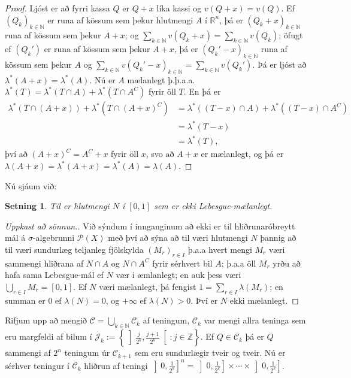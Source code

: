 \documentclass[a4paper,icelandic,11pt]{book}
\theoremstyle{plain}      \newtheorem{setn}{Setning}[chapter]
\theoremstyle{definition} \newtheorem{skilgr}[setn]{Skilgreining}
\theoremstyle{remark}     \newtheorem*{ath}{Athugasemd}
\newcommand{\R}{\mathbb R}
\newcommand{\N}{\mathbb N}
\newcommand{\Z}{\mathbb Z}
\begin{document}
\begin{proof}
  Ljóst er að fyrri kassa $Q$ er $Q+x$ líka kassi og $v(Q+x)=v(Q)$. Ef
  $(Q_{k})_{k\in\N}$ er runa af kössum sem þekur hlutmengi $A$ í
  $\R^{n}$, þá er $(Q_{k}+x)_{k\in\N}$ runa af kössum sem þekur $A+x$;
  og $\sum_{k\in\N}v(Q_{k}+x)=\sum_{k\in\N}v(Q_{k})$; öfugt ef
  $(Q_{k}')$ er runa af kössum sem þekur $A+x$, þá er
  $(Q_{k}'-x)_{k\in\N}$ runa af kössum sem þekur $A$ og
  $\sum_{k\in\N}v(Q_{k}'-x)_{k\in\N}=\sum_{k\in\N}v(Q_{k}')$. Þá er
  ljóst að $\lambda^{*}(A+x)=\lambda^{*}(A)$. Nú er $A$ mælanlegt
  þ.þ.a.a. $\lambda^{*}(T)=\lambda^{*}(T\cap{A})+\lambda^{*}(T\cap{A}^{C})$
  fyrir öll $T$. En þá er
  \begin{align*}
    \lambda^{*}(T\cap(A+x)) + \lambda^{*}(T\cap(A+x)^{C})
    &= \lambda^{*}((T-x)\cap A) + \lambda^{*}((T-x)\cap A^{C})
    \\
    &= \lambda^{*}(T-x)
    \\
    &= \lambda^{*}(T),
  \end{align*}
  því að $(A+x)^{C}=A^{C}+x$ fyrir öll $x$, svo að $A+x$ er mælanlegt,
  og þá er $\lambda(A+x)=\lambda^{*}(A+x)=\lambda^{*}(A)=\lambda(A)$.
\end{proof}
Nú sjáum við:
\begin{setn}
  Til er hlutmengi $N$ í $[0,1]$ sem er ekki Lebesgue-mælanlegt.
\end{setn}
\begin{proof}[Uppkast að sönnun.]
  Við sýndum í innganginum að ekki er til hliðrunaróbreytt mál á
  $\sigma$-algebrunni $\mathcal P(X)$ með því að sýna að til væri
  hlutmengi $N$ þannig að til væri sundurlæg teljanleg fjölskylda
  $(M_{r})_{r\in I}$ þ.a.a hvert mengi $M_{r}$ væri sammengi hliðrana
  af $N\cap A$ og $N\cap A^{C}$ fyrir sérhvert bil $A$; þ.a.a öll
  $M_{r}$ yrðu að hafa sama Lebesgue-mál ef $N$ vær i æmlanlegt; en
  auk þess væri $\bigcup_{r\in I}M_{r} = [0,1]$. Ef $N$ væri
  mælanlegt, þá fengist $1=\sum_{r\in I}\lambda(M_{r})$; en summan er
  $0$ ef $\lambda(N)=0$, og $+\infty$ ef $\lambda(N)>0$. Því er $N$
  ekki mælanlegt.
\end{proof}
Rifjum upp að mengið $\mathcal C=\bigcup_{k\in\N}\mathcal C_{k}$ af
teningum, $\mathcal C_{k}$ var mengi allra teninga sem eru margfeldi
af bilum í
$\mathcal{J}_{k}:=\left\{\left]\frac{j}{2^{k}},\frac{j+1}{2^{k}}\right[:j\in\Z\right\}$.
Ef $Q\in\mathcal C_{k}$ þá er $Q$ sammengi af $2^{n}$ teningum úr
$\mathcal C_{k+1}$ sem eru sundurlægir tveir og tveir. Nú er sérhver
teningur í $\mathcal C_{k}$ hliðrun af teningi
$\left]0,\frac{1}{2^{k}}\right]^{n}=\left]0,\frac{1}{2^{k}}\right]\times\cdots\times\left]0,\frac{1}{2^{k}}\right]$.
\end{document}
